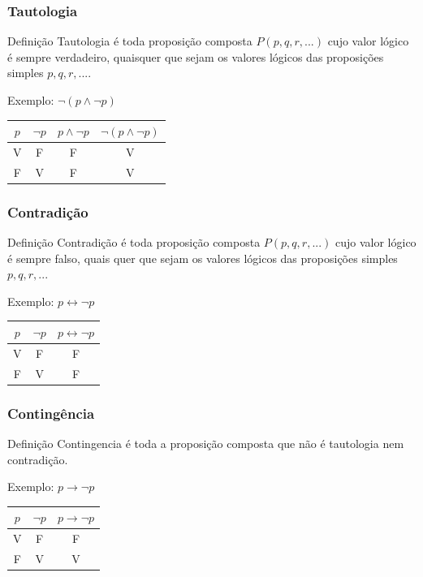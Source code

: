 \documentclass{beamer}
\begin{document}
\begin{frame}
\frametitle{Tautologia}

\begin{block}{Definição}
Tautologia é toda proposição composta $P(p, q,r, . . .)$ cujo valor lógico é sempre verdadeiro, quaisquer que sejam os valores lógicos das proposições
simples $p, q,r, . . .$.
\end{block}\vfill

\begin{exampleblock}{Exemplo: $\neg (p \wedge \neg p)$}
	\center
	\begin{tabular}{|c|c|c|c|}
		\hline
		$p$ & $\neg p$ &  $p \wedge \neg p$ & $\neg (p \wedge \neg p)$\\ \hline
		V & F  & F & V \\ \hline
		F & V  & F & V \\ \hline
	\end{tabular}
\end{exampleblock}
\end{frame}

\begin{frame}
\frametitle{Contradição}

\begin{block}{Definição}
Contradição é toda proposição composta $P(p, q,r, . . .)$ cujo valor lógico é sempre falso, quais quer que sejam os valores lógicos das proposições simples $p, q,r, . . .$
\end{block}\vfill

\begin{exampleblock}{Exemplo: $p \leftrightarrow \neg p$}
	\center
	\begin{tabular}{|c|c|c|}
		\hline
		$p$ & $\neg p$ &  $p \leftrightarrow \neg p$\\ \hline
		V & F  & F \\ \hline
		F & V  & F \\ \hline
	\end{tabular}
\end{exampleblock}
\end{frame}

\begin{frame}
\frametitle{Contingência}

\begin{block}{Definição}
Contingencia é toda a proposição composta que não é tautologia nem contradição.
\end{block}\vfill

\begin{exampleblock}{Exemplo: $p \rightarrow \neg p$}
	\center
	\begin{tabular}{|c|c|c|}
		\hline
		$p$ & $\neg p$ &  $p \rightarrow \neg p$\\ \hline
		V & F  & F \\ \hline
		F & V  & V \\ \hline
	\end{tabular}
\end{exampleblock}
\end{frame}
\end{document}
